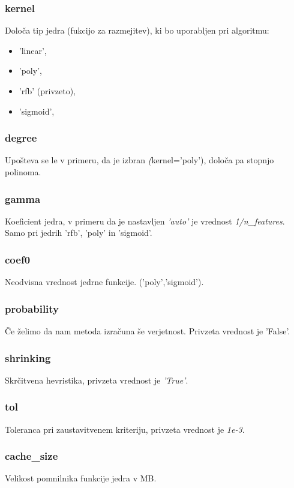 \documentclass[a4paper,11pt]{article}
\begin{document}
\subsubsection{kernel}
	Določa tip jedra (fukcijo za razmejitev), ki bo uporabljen pri algoritmu:
	\begin{itemize}
		\item{'linear',}
		\item{'poly',}
		\item{'rfb' (privzeto),}
		\item{'sigmoid',}
	\end{itemize}
	

\subsubsection{degree}
	Upošteva se le v primeru, da je izbran \textit(kernel='poly'), določa pa stopnjo polinoma.

\subsubsection{gamma}
	Koeficient jedra, v primeru da je nastavljen \textit{'auto'} je vrednost \textit{1/n_features}. Samo pri jedrih 'rfb', 'poly' in 'sigmoid'.
	
\subsubsection{coef0}
	Neodvisna vrednost jedrne funkcije. ('poly','sigmoid').

\subsubsection{probability}
	Če želimo da nam metoda izračuna še verjetnost. Privzeta vrednost je 'False'.

\subsubsection{shrinking}
	Skrčitvena hevristika, privzeta vrednost je \textit{'True'}.

\subsubsection{tol}
	Toleranca pri zaustavitvenem kriteriju, privzeta vrednost je \textit{1e-3}.
	
\subsubsection{cache_size}
	Velikost pomnilnika funkcije jedra v MB.
\end{document}
